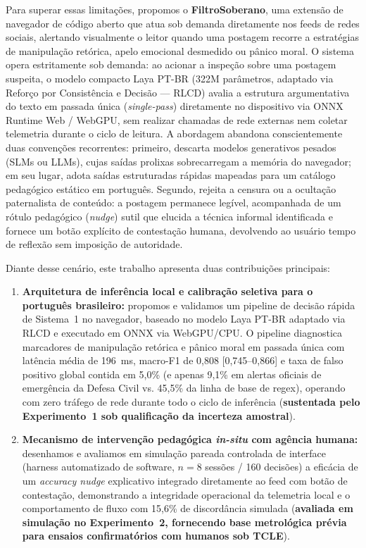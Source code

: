 \documentclass[runningheads]{llncs}
\begin{document}
Para superar essas limitações, propomos o \textbf{FiltroSoberano}, uma extensão de navegador de código aberto que atua sob demanda diretamente nos feeds de redes sociais, alertando visualmente o leitor quando uma postagem recorre a estratégias de manipulação retórica, apelo emocional desmedido ou pânico moral. O sistema opera estritamente sob demanda: ao acionar a inspeção sobre uma postagem suspeita, o modelo compacto Laya PT-BR (322M parâmetros, adaptado via Reforço por Consistência e Decisão --- RLCD) avalia a estrutura argumentativa do texto em passada única (\textit{single-pass}) diretamente no dispositivo via ONNX Runtime Web / WebGPU, sem realizar chamadas de rede externas nem coletar telemetria durante o ciclo de leitura. A abordagem abandona conscientemente duas convenções recorrentes: primeiro, descarta modelos generativos pesados (SLMs ou LLMs), cujas saídas prolixas sobrecarregam a memória do navegador; em seu lugar, adota saídas estruturadas rápidas mapeadas para um catálogo pedagógico estático em português. Segundo, rejeita a censura ou a ocultação paternalista de conteúdo: a postagem permanece legível, acompanhada de um rótulo pedagógico (\textit{nudge}) sutil que elucida a técnica informal identificada e fornece um botão explícito de contestação humana, devolvendo ao usuário tempo de reflexão sem imposição de autoridade.

Diante desse cenário, este trabalho apresenta duas contribuições principais:
\begin{enumerate}
    \item \textbf{Arquitetura de inferência local e calibração seletiva para o português brasileiro:} propomos e validamos um pipeline de decisão rápida de Sistema~1 no navegador, baseado no modelo Laya PT-BR adaptado via RLCD e executado em ONNX via WebGPU/CPU. O pipeline diagnostica marcadores de manipulação retórica e pânico moral em passada única com latência média de 196~ms, macro-F1 de 0,808 [0,745--0,866] e taxa de falso positivo global contida em 5,0\% (e apenas 9,1\% em alertas oficiais de emergência da Defesa Civil vs. 45,5\% da linha de base de regex), operando com zero tráfego de rede durante todo o ciclo de inferência (\textbf{sustentada pelo Experimento~1 sob qualificação da incerteza amostral}).
    \item \textbf{Mecanismo de intervenção pedagógica \textit{in-situ} com agência humana:} desenhamos e avaliamos em simulação pareada controlada de interface (harness automatizado de software, $n=8$ sessões / 160 decisões) a eficácia de um \textit{accuracy nudge} explicativo integrado diretamente ao feed com botão de contestação, demonstrando a integridade operacional da telemetria local e o comportamento de fluxo com 15,6\% de discordância simulada (\textbf{avaliada em simulação no Experimento~2, fornecendo base metrológica prévia para ensaios confirmatórios com humanos sob TCLE}).
\end{enumerate}
\end{document}
